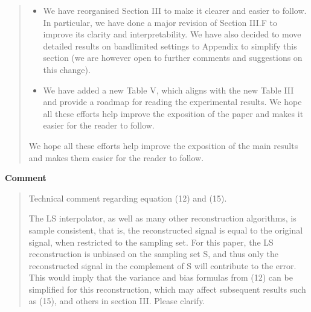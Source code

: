 \documentclass[11pt,onecolumn,journal]{IEEEtran}
\theoremstyle{definition}
\begin{document}
\begin{quote}
\begin{itemize}
\iffalse
This table acts as an overall guide on how each section is structured, and connects the contributions to the results in the following way:
\begin{enumerate}
    \item The characterisation is in the 'characterisation' column (and the 'existence' column gives a specific characterisation, more directly showing circumstances when reducing sample size reduces MSE)
    \item We see the relevant results in the 'bandlimited' rows; they correspond to Sections III-E and III-G
    \item This is presented in the Asymptotics column.
\end{enumerate}
\fi

\item We have reorganised Section III to make it clearer and easier to follow. In particular, we have done a major revision of Section III.F to improve its clarity and interpretability. We have also decided to move detailed results on bandlimited settings to Appendix to simplify this section (we are however open to further comments and suggestions on this change).
\item We have added a new Table V, which aligns with the new Table III and provide a roadmap for reading the experimental results. We hope all these efforts help improve the exposition of the paper and makes it easier for the reader to follow.
\end{itemize}

We hope all these efforts help improve the exposition
of the main results and makes them easier for the reader to follow.

\end{quote}

\textbf{Comment}
\begin{quote}
Technical comment regarding equation (12) and (15).

The LS interpolator, as well as many other reconstruction algorithms, is sample consistent, that is, the reconstructed signal is equal to the original signal, when restricted to the sampling set.  For this paper, the LS reconstruction is unbiased on the sampling set S, and thus only the reconstructed signal in the complement of S will contribute to the error. This would imply that the variance and bias formulas from (12) can be simplified for this reconstruction, which may affect subsequent results such as (15), and others in section III. Please clarify.
\end{quote}
\end{document}
